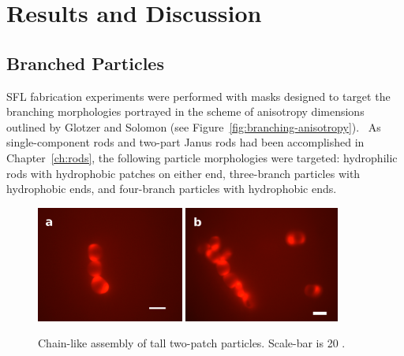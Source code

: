 \section{Results and Discussion}

\subsection{Branched Particles}


SFL fabrication experiments were performed with masks designed to target the branching morphologies
portrayed in the scheme of anisotropy dimensions outlined by Glotzer and Solomon
(see Figure~\ref{fig:branching-anisotropy}).~\cite{glotzer-solomon}  As single-component rods and 
two-part Janus rods had been accomplished in Chapter~\ref{ch:rods}, the following particle 
morphologies were targeted: hydrophilic rods with hydrophobic patches on either end, three-branch particles
with hydrophobic ends, and four-branch particles with hydrophobic ends.


\begin{figure}[h]
\begin{center}
\includegraphics[height=1.5in]{figures/complex-shapes/twopatch-3chain-sb20.png} \includegraphics[height=1.5in]{figures/complex-shapes/twopatch-flchain-sb20.png}
\end{center}
\caption{Chain-like assembly of tall two-patch particles. Scale-bar is 20 \microns.}
\label{fig:tall-2patch}
\end{figure}

